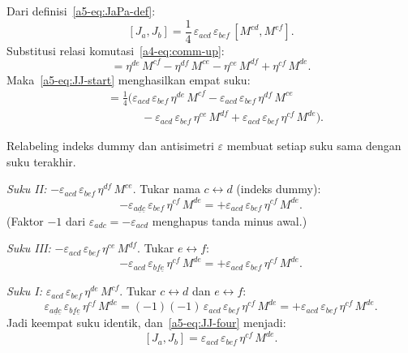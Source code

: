 Dari definisi~\eqref{a5-eq:JaPa-def}:
\begin{equation}\label{a5-eq:JJ-start}
    [J_a, J_b] = \frac{1}{4}\,\varepsilon_{acd}\,\varepsilon_{bef}\,[M^{cd}, M^{ef}].
\end{equation}
Substitusi relasi komutasi~\eqref{a4-eq:comm-up}:
\begin{equation}
    [M^{cd}, M^{ef}] = \eta^{de}\,M^{cf} - \eta^{df}\,M^{ce} - \eta^{ce}\,M^{df} + \eta^{cf}\,M^{de}.
\end{equation}
Maka~\eqref{a5-eq:JJ-start} menghasilkan empat suku:
\begin{align}
    [J_a,J_b] &= \frac{1}{4}\Big(
    \varepsilon_{acd}\,\varepsilon_{bef}\,\eta^{de}\,M^{cf}
    - \varepsilon_{acd}\,\varepsilon_{bef}\,\eta^{df}\,M^{ce} \nonumber\\
    &\qquad\quad - \varepsilon_{acd}\,\varepsilon_{bef}\,\eta^{ce}\,M^{df}
    + \varepsilon_{acd}\,\varepsilon_{bef}\,\eta^{cf}\,M^{de}
    \Big). \label{a5-eq:JJ-four}
\end{align}

\vspace{0.5em}
Relabeling indeks dummy dan antisimetri $\varepsilon$ membuat setiap suku sama dengan suku terakhir.

\noindent\emph{Suku II:} $-\varepsilon_{acd}\,\varepsilon_{bef}\,\eta^{df}\,M^{ce}$. Tukar nama $c \leftrightarrow d$ (indeks dummy):
\begin{equation}
    -\varepsilon_{a\underline{d}\underline{c}}\,\varepsilon_{bef}\,\eta^{cf}\,M^{de}
    = +\varepsilon_{acd}\,\varepsilon_{bef}\,\eta^{cf}\,M^{de}.
\end{equation}
(Faktor $-1$ dari $\varepsilon_{adc} = -\varepsilon_{acd}$ menghapus tanda minus awal.)

\noindent\emph{Suku III:} $-\varepsilon_{acd}\,\varepsilon_{bef}\,\eta^{ce}\,M^{df}$. Tukar $e \leftrightarrow f$:
\begin{equation}
    -\varepsilon_{acd}\,\varepsilon_{b\underline{f}\underline{e}}\,\eta^{cf}\,M^{de}
    = +\varepsilon_{acd}\,\varepsilon_{bef}\,\eta^{cf}\,M^{de}.
\end{equation}

\noindent\emph{Suku I:} $\varepsilon_{acd}\,\varepsilon_{bef}\,\eta^{de}\,M^{cf}$. Tukar $c \leftrightarrow d$ dan $e \leftrightarrow f$:
\begin{equation}
    \varepsilon_{a\underline{d}\underline{c}}\,\varepsilon_{b\underline{f}\underline{e}}\,\eta^{cf}\,M^{de}
    = (-1)(-1)\,\varepsilon_{acd}\,\varepsilon_{bef}\,\eta^{cf}\,M^{de}
    = +\varepsilon_{acd}\,\varepsilon_{bef}\,\eta^{cf}\,M^{de}.
\end{equation}
Jadi keempat suku identik, dan~\eqref{a5-eq:JJ-four} menjadi:
\begin{equation}\label{a5-eq:JJ-simplified}
    [J_a,J_b] = \varepsilon_{acd}\,\varepsilon_{bef}\,\eta^{cf}\,M^{de}.
\end{equation}

